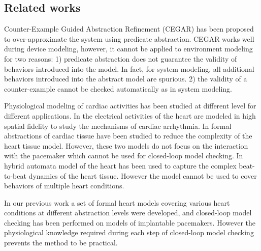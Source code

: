 \subsection{Related works}
Counter-Example Guided Abstraction Refinement (CEGAR) \cite{CEGAR} has been proposed to over-approximate the system using predicate abstraction. 
CEGAR works well during device modeling, however, it cannot be applied to environment modeling for two reasons: 1) predicate abstraction does not guarantee the validity of behaviors introduced into the model. In fact, for system modeling, all additional behaviors introduced into the abstract model are spurious. 2) the validity of a counter-example cannot be checked automatically as in system modeling. 

Physiological modeling of cardiac activities has been studied at different level for different applications. In \cite{natalia} the electrical activities of the heart are modeled in high spatial fidelity to study the mechanisms of cardiac arrhythmia. In \cite{radu} formal abstractions of cardiac tissue have been studied to reduce the complexity of the heart tissue model. However, these two models do not focus on the interaction with the pacemaker which cannot be used for closed-loop model checking. In \cite{marta} hybrid automata model of the heart has been used to capture the complex beat-to-beat dynamics of the heart tissue. However the model cannot be used to cover behaviors of multiple heart conditions.

In our previous work \cite{sttt13} a set of formal heart models covering various heart conditions at different abstraction levels were developed, and closed-loop model checking has been performed on models of implantable pacemakers. 
However the physiological knowledge required during each step of closed-loop model checking prevents the method to be practical.

